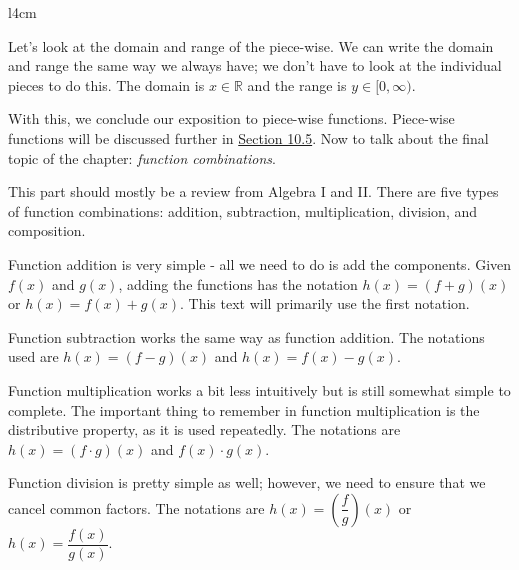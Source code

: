 \documentclass[lang=en,11pt]{elegantbook}
\begin{document}
\begin{wrapfigure}{l}{4cm}
    \centering
\end{wrapfigure}

Let's look at the domain and range of the piece-wise.  We can write the domain and range the same way we always have; we don't have to look at the individual pieces to do this.  The domain is $x\in\mathbb{R}$ and the range is $y\in[0,\infty)$.  

With this, we conclude our exposition to piece-wise functions.  Piece-wise functions will be discussed further in \hyperlink{section.10.5}{Section 10.5}.  Now to talk about the final topic of the chapter: \textit{function combinations}.

This part should mostly be a review from Algebra I and II.  There are five types of function combinations: addition, subtraction, multiplication, division, and composition.

Function addition is very simple - all we need to do is add the components.  Given $f(x)$ and $g(x)$, adding the functions has the notation $h(x)=(f+g)(x)$ or $h(x)=f(x)+g(x)$.  This text will primarily use the first notation.

Function subtraction works the same way as function addition.  The notations used are $h(x)=(f-g)(x)$ and $h(x)=f(x)-g(x)$.

Function multiplication works a bit less intuitively but is still somewhat simple to complete.  The important thing to remember in function multiplication is the distributive property, as it is used repeatedly.  The notations are $h(x)=(f\cdot g)(x)$ and $f(x)\cdot g(x)$.

Function division is pretty simple as well; however, we need to ensure that we cancel common factors.  The notations are $h(x)=\left(\dfrac{f}{g}\right)(x)$ or $h(x)=\dfrac{f(x)}{g(x)}$.
\end{document}
